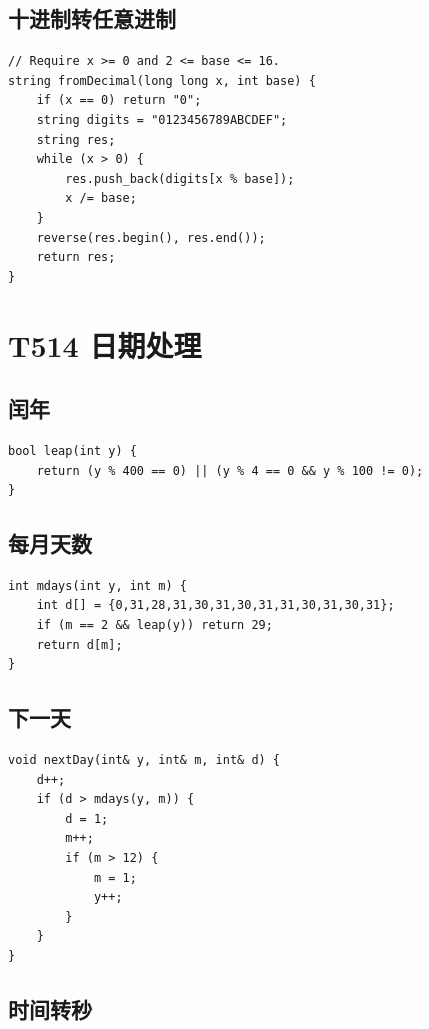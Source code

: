 \subsection{十进制转任意进制}

\begin{lstlisting}
// Require x >= 0 and 2 <= base <= 16.
string fromDecimal(long long x, int base) {
    if (x == 0) return "0";
    string digits = "0123456789ABCDEF";
    string res;
    while (x > 0) {
        res.push_back(digits[x % base]);
        x /= base;
    }
    reverse(res.begin(), res.end());
    return res;
}
\end{lstlisting}


\section{T514 日期处理}\label{sec:09-39}\label{tpl:514}

\subsection{闰年}

\begin{lstlisting}
bool leap(int y) {
    return (y % 400 == 0) || (y % 4 == 0 && y % 100 != 0);
}
\end{lstlisting}

\subsection{每月天数}

\begin{lstlisting}
int mdays(int y, int m) {
    int d[] = {0,31,28,31,30,31,30,31,31,30,31,30,31};
    if (m == 2 && leap(y)) return 29;
    return d[m];
}
\end{lstlisting}

\subsection{下一天}

\begin{lstlisting}
void nextDay(int& y, int& m, int& d) {
    d++;
    if (d > mdays(y, m)) {
        d = 1;
        m++;
        if (m > 12) {
            m = 1;
            y++;
        }
    }
}
\end{lstlisting}

\subsection{时间转秒}

